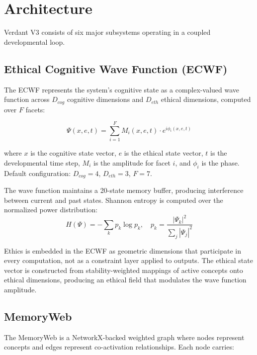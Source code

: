 \documentclass[11pt,a4paper]{article}
\begin{document}
\section{Architecture}

Verdant V3 consists of six major subsystems operating in a coupled developmental loop.

\subsection{Ethical Cognitive Wave Function (ECWF)}

The ECWF represents the system's cognitive state as a complex-valued wave function across $D_{cog}$ cognitive dimensions and $D_{eth}$ ethical dimensions, computed over $F$ facets:

\begin{equation}
\Psi(x, e, t) = \sum_{i=1}^{F} M_i(x, e, t) \cdot e^{i\phi_i(x, e, t)}
\label{eq:ecwf}
\end{equation}

where $x$ is the cognitive state vector, $e$ is the ethical state vector, $t$ is the developmental time step, $M_i$ is the amplitude for facet $i$, and $\phi_i$ is the phase. Default configuration: $D_{cog} = 4$, $D_{eth} = 3$, $F = 7$.

The wave function maintains a 20-state memory buffer, producing interference between current and past states. Shannon entropy is computed over the normalized power distribution:
\begin{equation}
H(\Psi) = -\sum_k p_k \log p_k, \quad p_k = \frac{|\Psi_k|^2}{\sum_j |\Psi_j|^2}
\label{eq:entropy}
\end{equation}

Ethics is embedded in the ECWF as geometric dimensions that participate in every computation, not as a constraint layer applied to outputs. The ethical state vector is constructed from stability-weighted mappings of active concepts onto ethical dimensions, producing an ethical field that modulates the wave function amplitude.

\subsection{MemoryWeb}

The MemoryWeb is a NetworkX-backed weighted graph where nodes represent concepts and edges represent co-activation relationships. Each node carries:
\end{document}
